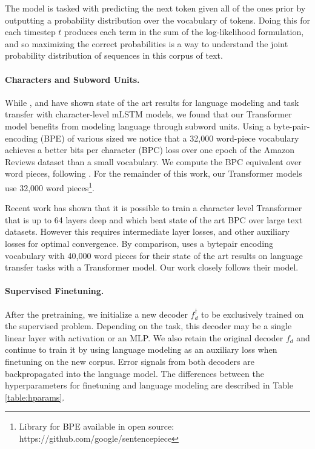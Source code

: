 \documentclass[letterpaper]{article} %
\begin{document}
The model is tasked with predicting the next token given all of the ones prior by outputting a probability distribution over the vocabulary of tokens. Doing this for each timestep $t$ produces each term in the sum of the log-likelihood formulation, and so maximizing the correct probabilities is a way to understand the joint probability distribution of sequences in this corpus of text. 



\paragraph{Characters and Subword Units.}
While \protect\cite{Radford2017}, \protect\cite{Gray2017} and \cite{Puri2018} have shown state of the art results for language modeling and task transfer with character-level mLSTM models, we found that our Transformer model benefits from modeling language through subword units. Using a byte-pair-encoding (BPE) \protect\cite{BPE2015} of various sized %
we notice that a 32,000 word-piece vocabulary achieves a better bits per character (BPC) loss over one epoch of the Amazon Reviews dataset \protect\cite{McAuley2015} than a small vocabulary. We compute the BPC equivalent over word pieces, following \protect\cite{SubwordMikolov2012}. 
For the remainder of this work, our Transformer models use 32,000 word pieces\footnote{Library for BPE available in open source: https://github.com/google/sentencepiece}. 

Recent work \protect\cite{DeepXformer2018} has shown that it is possible to train a character level Transformer that is up to 64 layers deep and which beat state of the art BPC over large text datasets. However this requires intermediate layer losses, and other auxiliary losses for optimal convergence. By comparison, \protect\cite{Radford2018} uses a bytepair encoding vocabulary with 40,000 word pieces for their state of the art results on language transfer tasks with a Transformer model. Our work closely follows their model. 



\paragraph{Supervised Finetuning.}
After the pretraining, we initialize a new decoder $f_d^{\dagger}$ to be exclusively trained on the supervised problem. Depending on the task, this decoder may be a single linear layer with activation or an MLP. We also retain the original decoder $f_d$ and continue to train it by using language modeling as an auxiliary loss when finetuning on the new corpus. Error signals from both decoders are backpropagated into the language model. The differences between the hyperparameters for finetuning and language modeling are described in Table \ref{table:hparams}.
\end{document}
